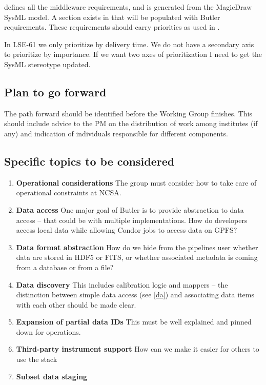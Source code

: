  defines all the middleware requirements, and is generated from the MagicDraw SysML model.
A section exists in  that will be populated with Butler requirements.
These requirements should carry priorities as used in .

\begin{draftnote}
In LSE-61 we only prioritize by delivery time.
We do not have a secondary axis to prioritize by importance.
If we want two axes of prioritization I need to get the SysML stereotype updated.
\end{draftnote}

\subsection{Plan to go forward}

The path forward should be identified before the Working Group finishes.
This should include advice to the PM on the distribution of work among institutes (if any) and indication of individuals responsible for different components.

\subsection{Specific topics to be considered}

\begin{enumerate}
\item \textbf{Operational considerations}
The group must consider how to take care of operational constraints at NCSA.

\item \textbf{Data access}\label{da}
One major goal of Butler is to provide abstraction to data access -- that could be with multiple implementations.
How do developers access local data while allowing Condor jobs to access data on GPFS?

\item \textbf{Data format abstraction}
How do we hide from the pipelines user whether data are stored in HDF5 or FITS, or whether associated metadata is coming from a database or from a file?

\item \textbf{Data discovery}
This includes  calibration logic and mappers -- the distinction between simple data access (see \ref{da}) and associating data items with each other should be made clear.

\item \textbf{Expansion of partial data IDs} This must be well explained and pinned down for operations.

\item \textbf{Third-party instrument support}  How can we make it easier for others to use the stack
\item \textbf{Subset data staging}
\end{enumerate}


